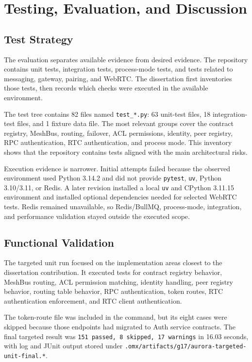 \chapter{Testing, Evaluation, and Discussion}
\label{chap:evaluation}

\section{Test Strategy}
\label{sec:test-strategy}

The evaluation separates available evidence from desired evidence. The repository contains unit tests, integration tests, process-mode tests, and tests related to messaging, gateway, pairing, and WebRTC. The dissertation first inventories those tests, then records which checks were executed in the available environment.

The test tree contains 82 files named \texttt{test\_*.py}: 63 unit-test files, 18 integration-test files, and 1 fixture data file. The most relevant groups cover the contract registry, MeshBus, routing, failover, ACL permissions, identity, peer registry, RPC authentication, RTC authentication, and process mode. This inventory shows that the repository contains tests aligned with the main architectural risks.

Execution evidence is narrower. Initial attempts failed because the observed environment used Python 3.14.2 and did not provide \texttt{pytest}, \texttt{uv}, Python 3.10/3.11, or Redis. A later revision installed a local \texttt{uv} and CPython 3.11.15 environment and installed optional dependencies needed for selected WebRTC tests. Redis remained unavailable, so Redis/BullMQ, process-mode, integration, and performance validation stayed outside the executed scope.

\section{Functional Validation}
\label{sec:functional-validation}

The targeted unit run focused on the implementation areas closest to the dissertation contribution. It executed tests for contract registry behavior, MeshBus routing, ACL permission matching, identity handling, peer registry behavior, routing table behavior, RPC authentication, token routes, RTC authentication enforcement, and RTC client authentication.

The token-route file was included in the command, but its eight cases were skipped because those endpoints had migrated to Auth service contracts. The final targeted result was \texttt{151 passed, 8 skipped, 17 warnings} in 16.03 seconds, with log and JUnit output stored under \texttt{.omx/artifacts/g17/aurora-targeted-unit-final.*}.

